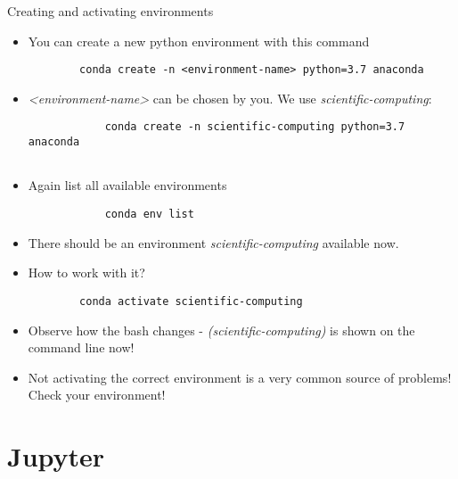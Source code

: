\begin{frame}[fragile]{Creating and activating environments}
	
	\begin{itemize}
		\item You can create a new python environment with this command
		\begin{verbatim}
		conda create -n <environment-name> python=3.7 anaconda
		\end{verbatim}
		
		\item \textit{<environment-name>} can be chosen by you. We use \textit{scientific-computing}: 
		\begin{verbatim}
			conda create -n scientific-computing python=3.7 anaconda
		
		\end{verbatim}
		
		\item Again list all available environments
			\begin{verbatim}
			conda env list
			\end{verbatim}
		\item There should be an environment \textit{scientific-computing} available now.
		\item How to work with it? 
		\begin{verbatim}
		conda activate scientific-computing
		\end{verbatim}
		\item Observe how the bash changes - \textit{(scientific-computing)} is shown on the command line now!
		\item Not activating the correct environment is a very common source of problems! Check your environment! 
		
	\end{itemize}
	
\end{frame}


\section{Jupyter}

